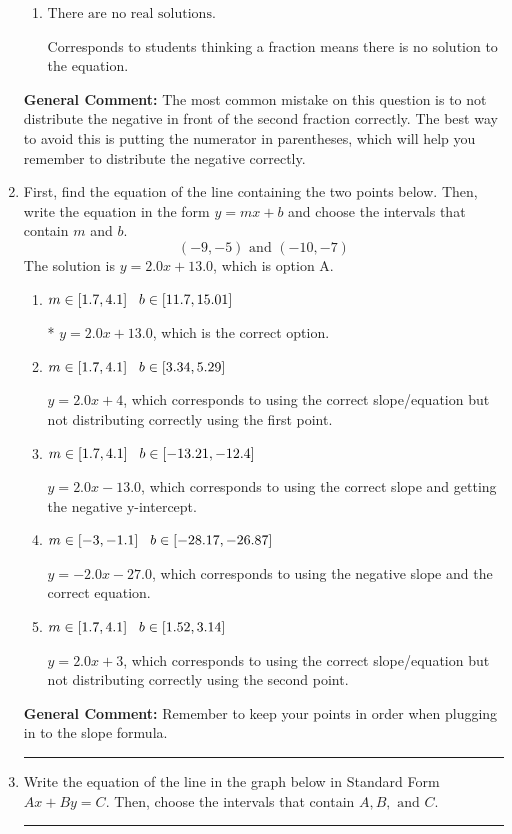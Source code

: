 \documentclass{extbook}[14pt]
\newcommand{\litem}[1]{\item #1

\rule{\textwidth}{0.4pt}}
\begin{document}
\begin{enumerate}
{\begin{enumerate}[label=\Alph*.]
$x = 0.000$, which corresponds to getting the negative of the actual solution.
\item \( \text{There are no real solutions.} \)

Corresponds to students thinking a fraction means there is no solution to the equation.
\end{enumerate}

\textbf{General Comment:} The most common mistake on this question is to not distribute the negative in front of the second fraction correctly. The best way to avoid this is putting the numerator in parentheses, which will help you remember to distribute the negative correctly.
}
\litem{
First, find the equation of the line containing the two points below. Then, write the equation in the form $ y=mx+b $ and choose the intervals that contain $m$ and $b$.
\[ (-9, -5) \text{ and } (-10, -7) \]The solution is \( y = 2.0x + 13.0 \), which is option A.\begin{enumerate}[label=\Alph*.]
\item \( m \in [1.7, 4.1] \hspace*{3mm} b \in [11.7, 15.01] \)

* $y = 2.0x + 13.0$, which is the correct option.
\item \( m \in [1.7, 4.1] \hspace*{3mm} b \in [3.34, 5.29] \)

 $y = 2.0x + 4$, which corresponds to using the correct slope/equation but not distributing correctly using the first point.
\item \( m \in [1.7, 4.1] \hspace*{3mm} b \in [-13.21, -12.4] \)

 $y = 2.0x -13.0$, which corresponds to using the correct slope and getting the negative y-intercept.
\item \( m \in [-3, -1.1] \hspace*{3mm} b \in [-28.17, -26.87] \)

 $y = -2.0x -27.0$, which corresponds to using the negative slope and the correct equation.
\item \( m \in [1.7, 4.1] \hspace*{3mm} b \in [1.52, 3.14] \)

 $y = 2.0x + 3$, which corresponds to using the correct slope/equation but not distributing correctly using the second point.
\end{enumerate}

\textbf{General Comment:} Remember to keep your points in order when plugging in to the slope formula.
}
\litem{
Write the equation of the line in the graph below in Standard Form $Ax+By=C$. Then, choose the intervals that contain $A, B, \text{ and } C$.

}
\end{enumerate}
\end{document}
